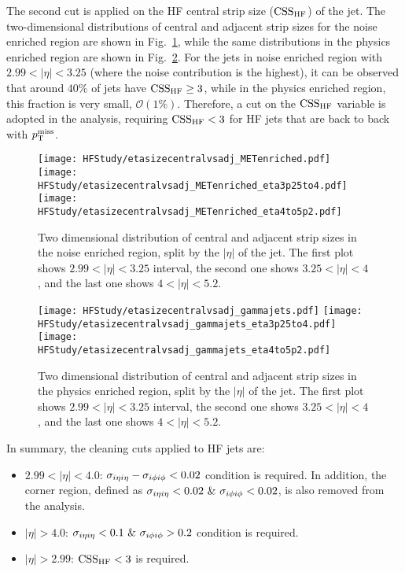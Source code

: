 The second cut is applied on the HF central strip size ($\mathrm{CSS_{HF}}$) of the jet. The two-dimensional distributions of central and adjacent strip sizes for the noise enriched
region are shown in Fig.~\ref{fig:stripsize_noise_enriched}, while the same distributions in the physics enriched region are shown in Fig.~\ref{fig:stripsize_phys_enriched}.
For the jets in noise enriched region with $2.99 < |\eta| < 3.25$ (where the noise contribution is the highest), it can be observed that around $40\%$ of jets
have $\mathrm{CSS_{HF}} \geq 3$, while in the physics enriched region, this fraction is very small, $\mathcal{O}(1\%)$. Therefore, a cut on the $\mathrm{CSS_{HF}}$ variable is adopted in 
the analysis, requiring $\mathrm{CSS_{HF}} < 3$ for HF jets that are back to back with $p_{\textrm{T}}^{\textrm{miss}}$. 

\begin{figure}
    \centering
    \texttt{[image: HFStudy/etasizecentralvsadj\_METenriched.pdf]}
    \texttt{[image: HFStudy/etasizecentralvsadj\_METenriched\_eta3p25to4.pdf]}
    \texttt{[image: HFStudy/etasizecentralvsadj\_METenriched\_eta4to5p2.pdf]}
    \caption{Two dimensional distribution of central and adjacent strip sizes in the noise enriched region, split by the $|\eta|$ of the jet. The first plot shows 
    $2.99 < |\eta| < 3.25$ interval, the second one shows $3.25 < |\eta| < 4$, and the last one shows $4 < |\eta| < 5.2$.}
    \label{fig:stripsize_noise_enriched}
\end{figure}

\begin{figure}
    \centering
    \texttt{[image: HFStudy/etasizecentralvsadj\_gammajets.pdf]}
    \texttt{[image: HFStudy/etasizecentralvsadj\_gammajets\_eta3p25to4.pdf]}
    \texttt{[image: HFStudy/etasizecentralvsadj\_gammajets\_eta4to5p2.pdf]}
    \caption{Two dimensional distribution of central and adjacent strip sizes in the physics enriched region, split by the $|\eta|$ of the jet. The first plot shows 
    $2.99 < |\eta| < 3.25$ interval, the second one shows $3.25 < |\eta| < 4$, and the last one shows $4 < |\eta| < 5.2$.}
    \label{fig:stripsize_phys_enriched}
\end{figure}


In summary, the cleaning cuts applied to HF jets are:
\begin{itemize}
    \item $2.99 < |\eta| < 4.0$: $\sigma_{i\eta i\eta} - \sigma_{i\phi i\phi} < 0.02$ condition is required. In addition, the corner region, defined as $\sigma_{i\eta i\eta} < 0.02 \ \& \ \sigma_{i\phi i\phi} < 0.02$,
    is also removed from the analysis.
    \item $|\eta| > 4.0$: $\sigma_{i\eta i\eta} < 0.1 \ \& \ \sigma_{i\phi i\phi} > 0.2$ condition is required.
    \item $|\eta| > 2.99$: $\mathrm{CSS_{HF}} < 3$ is required.
\end{itemize}

